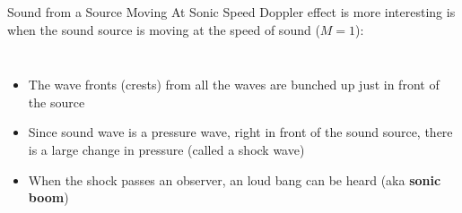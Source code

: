 \documentclass[12pt,aspectratio=169]{beamer}
\begin{document}
\begin{frame}{Sound from a Source Moving At Sonic Speed}
  Doppler effect is more interesting is when the sound source is moving at the
  speed of sound ($M=1$):
  \vspace{.2in}
  \begin{columns}
    
      
    \begin{itemize}
    \item The wave fronts (crests) from all the waves are bunched up just in
      front of the source
    \item Since sound wave is a pressure wave, right in front of the sound
      source, there is a large change in pressure (called a shock wave)
    \item When the shock passes an observer, an loud bang can be heard (aka
      \textbf{sonic boom})
    \end{itemize}
  \end{columns}
\end{frame}
\end{document}
